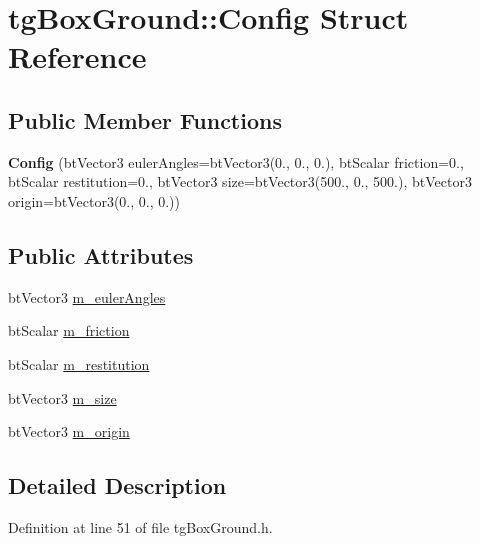 \hypertarget{structtg_box_ground_1_1_config}{\section{tg\-Box\-Ground\-:\-:Config Struct Reference}
\label{structtg_box_ground_1_1_config}
}
\subsection*{Public Member Functions}
\begin{DoxyCompactItemize}
\item 
\hypertarget{structtg_box_ground_1_1_config_ac6c9f68defbd667bce073757e1756243}{{\bfseries Config} (bt\-Vector3 euler\-Angles=bt\-Vector3(0., 0., 0.), bt\-Scalar friction=0., bt\-Scalar restitution=0., bt\-Vector3 size=bt\-Vector3(500., 0., 500.), bt\-Vector3 origin=bt\-Vector3(0., 0., 0.))}\label{structtg_box_ground_1_1_config_ac6c9f68defbd667bce073757e1756243}

\end{DoxyCompactItemize}
\subsection*{Public Attributes}
\begin{DoxyCompactItemize}
\item 
bt\-Vector3 \hyperlink{structtg_box_ground_1_1_config_ada74ac4724fe8f9f7a74fc90d7e93110}{m\-\_\-euler\-Angles}
\item 
bt\-Scalar \hyperlink{structtg_box_ground_1_1_config_ad81773afa88c71825e73ac999a8f3062}{m\-\_\-friction}
\item 
bt\-Scalar \hyperlink{structtg_box_ground_1_1_config_ae8bceb792bc8c1b558e0ef7c12ec8332}{m\-\_\-restitution}
\item 
bt\-Vector3 \hyperlink{structtg_box_ground_1_1_config_a1873e1e4cc14f026e3df1ffb6c0c8156}{m\-\_\-size}
\item 
bt\-Vector3 \hyperlink{structtg_box_ground_1_1_config_a30afd89f94bd4634a45c3dae1cf1628c}{m\-\_\-origin}
\end{DoxyCompactItemize}


\subsection{Detailed Description}


Definition at line 51 of file tg\-Box\-Ground.\-h.



